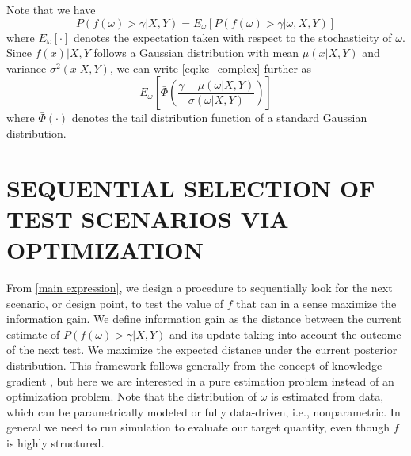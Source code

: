 \documentclass{wscpaperproc}
\theoremstyle{wsc}
\begin{document}
Note that we have
\begin{equation}
P(f(\omega)>\gamma|X,Y) = E_\omega[P(f(\omega)>\gamma |\omega,X,Y)]
\label{eq:ke_complex}
\end{equation}
where $E_\omega[\cdot]$ denotes the expectation taken with respect to the stochasticity of $\omega$. Since $f(x)|X,Y$ follows a Gaussian distribution with mean $\mu(x|X,Y)$ and variance $\sigma^2(x|X,Y)$, we can write \eqref{eq:ke_complex} further as
\begin{equation}
E_\omega\left[\bar\Phi\left(\frac{\gamma-\mu(\omega|X,Y)}{\sigma(\omega|X,Y)}\right)\right]
\label{main expression}
\end{equation}
where $\bar\Phi(\cdot)$ denotes the tail distribution function of a standard Gaussian distribution. 


\section{SEQUENTIAL SELECTION OF TEST SCENARIOS VIA OPTIMIZATION} \label{sec:optim}


From \eqref{main expression}, we design a procedure to sequentially look for the next scenario, or design point, to test the value of $f$ that can in a sense maximize the information gain. We define information gain as the distance between the current estimate of $P(f(\omega)>\gamma|X,Y)$ and its update taking into account the outcome of the next test. We maximize the expected distance under the current posterior distribution. This framework follows generally from the concept of knowledge gradient \cite{powell2012optimal}, but here we are interested in a pure estimation problem instead of an optimization problem. Note that the distribution of $\omega$ is estimated from data, which can be parametrically modeled or fully data-driven, i.e., nonparametric. In general we need to run simulation to evaluate our target quantity, even though $f$ is highly structured.
\end{document}
